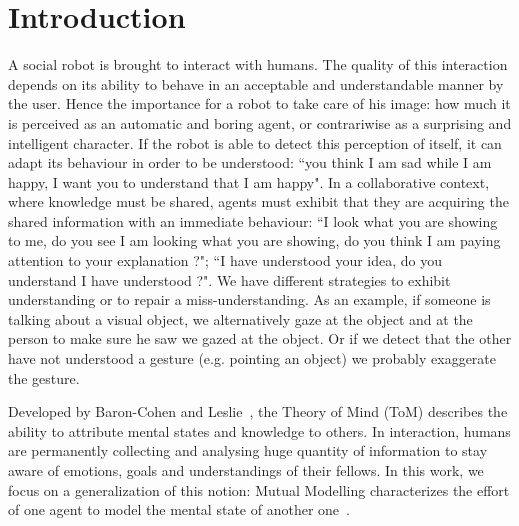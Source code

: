 \documentclass[conference]{IEEEtran}
\begin{document}
\section{Introduction}
%
%
%
%
%
%
%
%


A social robot is brought to interact with humans. The quality of this interaction depends on its ability to behave in an acceptable and understandable manner by the user. Hence the importance for a robot to take care of his image: how much it is perceived as an automatic and boring agent, or contrariwise as a surprising and intelligent character. If the robot is able to detect this perception of itself, it can adapt its behaviour in order to be understood: ``you think I am sad while I am happy, I want you to understand that I am happy". In a collaborative context, where knowledge must be shared, agents must exhibit that they are acquiring the shared information with an immediate behaviour: ``I look what you are showing to me, do you see I am looking what you are showing, do you think I am paying attention to your explanation ?"; ``I have understood your idea, do you understand I have understood ?". We have different strategies to exhibit understanding or to repair a miss-understanding. As an example, if someone is talking about a visual object, we alternatively gaze at the object and at the person to make sure he saw we gazed at the object. Or if we detect that the other have not understood a gesture (e.g. pointing an object) we probably exaggerate the gesture.

Developed by Baron-Cohen and Leslie~\cite{baron1985does}, the Theory of Mind (ToM) describes the ability to attribute mental states and knowledge to others. In interaction, humans are permanently collecting and analysing huge quantity of information to stay aware of emotions, goals and understandings of their fellows. In this work, we focus on a generalization of this notion: Mutual Modelling characterizes the effort of one agent to model the mental state of another one~\cite{dillenbourg1999you}. 
\end{document}
